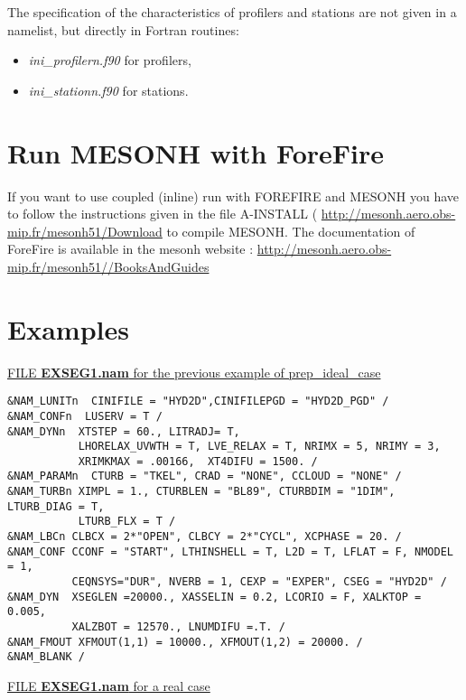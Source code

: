 The specification of the characteristics of profilers and stations are not
 given in a namelist, but directly in Fortran routines: 
\begin{itemize}
\item  {\it ini\_profilern.f90} for profilers,
\item  {\it ini\_stationn.f90} for stations.
\end{itemize}
\newpage
\section{Run MESONH with ForeFire}
 If you want to use coupled (inline) run with FOREFIRE and MESONH you have to follow the instructions given in  the file A-INSTALL ( \url{http://mesonh.aero.obs-mip.fr/mesonh51/Download} to compile MESONH.
The documentation of ForeFire  is available in the mesonh website : \url{http://mesonh.aero.obs-mip.fr/mesonh51//BooksAndGuides}


\section{Examples }

\underline{FILE {\bf EXSEG1.nam} for the previous example of prep\_ideal\_case}

\begin{verbatim}
&NAM_LUNITn  CINIFILE = "HYD2D",CINIFILEPGD = "HYD2D_PGD" /
&NAM_CONFn  LUSERV = T /
&NAM_DYNn  XTSTEP = 60., LITRADJ= T,
           LHORELAX_UVWTH = T, LVE_RELAX = T, NRIMX = 5, NRIMY = 3, 
           XRIMKMAX = .00166,  XT4DIFU = 1500. /
&NAM_PARAMn  CTURB = "TKEL", CRAD = "NONE", CCLOUD = "NONE" /
&NAM_TURBn XIMPL = 1., CTURBLEN = "BL89", CTURBDIM = "1DIM", LTURB_DIAG = T,
           LTURB_FLX = T /
&NAM_LBCn CLBCX = 2*"OPEN", CLBCY = 2*"CYCL", XCPHASE = 20. /
&NAM_CONF CCONF = "START", LTHINSHELL = T, L2D = T, LFLAT = F, NMODEL = 1, 
          CEQNSYS="DUR", NVERB = 1, CEXP = "EXPER", CSEG = "HYD2D" /
&NAM_DYN  XSEGLEN =20000., XASSELIN = 0.2, LCORIO = F, XALKTOP = 0.005,
          XALZBOT = 12570., LNUMDIFU =.T. /
&NAM_FMOUT XFMOUT(1,1) = 10000., XFMOUT(1,2) = 20000. /
&NAM_BLANK /
\end{verbatim}
\newpage
\underline{FILE {\bf EXSEG1.nam} for a real case}

